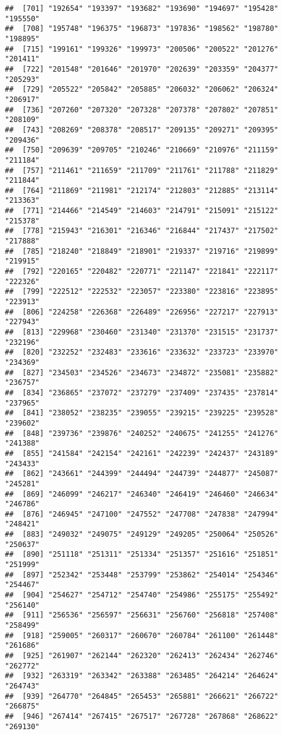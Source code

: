 \documentclass[]{article}
\begin{document}
\begin{verbatim}
##  [701] "192654" "193397" "193682" "193690" "194697" "195428" "195550"
##  [708] "195748" "196375" "196873" "197836" "198562" "198780" "198895"
##  [715] "199161" "199326" "199973" "200506" "200522" "201276" "201411"
##  [722] "201548" "201646" "201970" "202639" "203359" "204377" "205293"
##  [729] "205522" "205842" "205885" "206032" "206062" "206324" "206917"
##  [736] "207260" "207320" "207328" "207378" "207802" "207851" "208109"
##  [743] "208269" "208378" "208517" "209135" "209271" "209395" "209436"
##  [750] "209639" "209705" "210246" "210669" "210976" "211159" "211184"
##  [757] "211461" "211659" "211709" "211761" "211788" "211829" "211844"
##  [764] "211869" "211981" "212174" "212803" "212885" "213114" "213363"
##  [771] "214466" "214549" "214603" "214791" "215091" "215122" "215378"
##  [778] "215943" "216301" "216346" "216844" "217437" "217502" "217888"
##  [785] "218240" "218849" "218901" "219337" "219716" "219899" "219915"
##  [792] "220165" "220482" "220771" "221147" "221841" "222117" "222326"
##  [799] "222512" "222532" "223057" "223380" "223816" "223895" "223913"
##  [806] "224258" "226368" "226489" "226956" "227217" "227913" "227943"
##  [813] "229968" "230460" "231340" "231370" "231515" "231737" "232196"
##  [820] "232252" "232483" "233616" "233632" "233723" "233970" "234369"
##  [827] "234503" "234526" "234673" "234872" "235081" "235882" "236757"
##  [834] "236865" "237072" "237279" "237409" "237435" "237814" "237965"
##  [841] "238052" "238235" "239055" "239215" "239225" "239528" "239602"
##  [848] "239736" "239876" "240252" "240675" "241255" "241276" "241388"
##  [855] "241584" "242154" "242161" "242239" "242437" "243189" "243433"
##  [862] "243661" "244399" "244494" "244739" "244877" "245087" "245281"
##  [869] "246099" "246217" "246340" "246419" "246460" "246634" "246786"
##  [876] "246945" "247100" "247552" "247708" "247838" "247994" "248421"
##  [883] "249032" "249075" "249129" "249205" "250064" "250526" "250637"
##  [890] "251118" "251311" "251334" "251357" "251616" "251851" "251999"
##  [897] "252342" "253448" "253799" "253862" "254014" "254346" "254467"
##  [904] "254627" "254712" "254740" "254986" "255175" "255492" "256140"
##  [911] "256536" "256597" "256631" "256760" "256818" "257408" "258499"
##  [918] "259005" "260317" "260670" "260784" "261100" "261448" "261686"
##  [925] "261907" "262144" "262320" "262413" "262434" "262746" "262772"
##  [932] "263319" "263342" "263388" "263485" "264214" "264624" "264743"
##  [939] "264770" "264845" "265453" "265881" "266621" "266722" "266875"
##  [946] "267414" "267415" "267517" "267728" "267868" "268622" "269130"

\end{verbatim}
\end{document}

